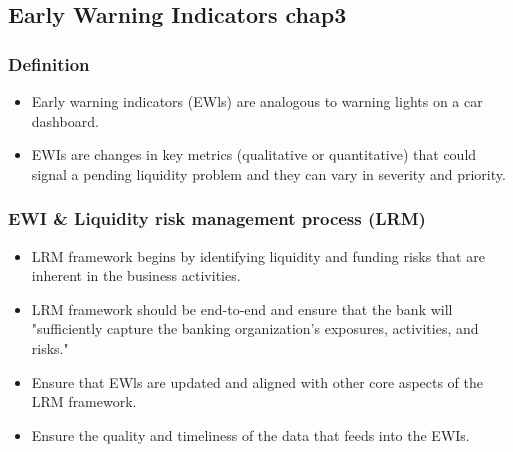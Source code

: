 \subsection{Early Warning Indicators chap3}

 




\subsubsection{Definition}
\begin{itemize}
\item Early warning indicators (EWls) are analogous to warning lights on a car dashboard.
\item EWIs are changes in key metrics (qualitative or quantitative) that could signal a pending liquidity problem and they can vary in severity and priority.
\end{itemize}



\subsubsection{EWI \& Liquidity risk management process (LRM)}
\begin{itemize}
\item LRM framework begins by identifying liquidity and funding risks that are inherent in the business activities.
\item LRM framework should be end-to-end and ensure that the bank will "sufficiently capture the banking organization's exposures, activities, and risks."
\item Ensure that EWls are updated and aligned with other core aspects of the LRM framework.
\item Ensure the quality and timeliness of the data that feeds into the EWIs.
\end{itemize}



